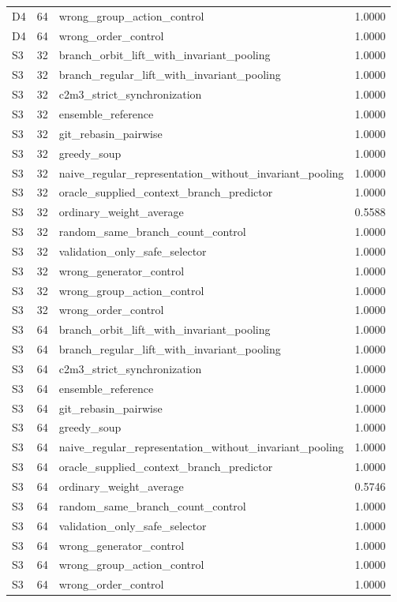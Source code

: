 \begin{tabular}{llll}
D4 & 64 & wrong\_group\_action\_control & 1.0000\\
D4 & 64 & wrong\_order\_control & 1.0000\\
S3 & 32 & branch\_orbit\_lift\_with\_invariant\_pooling & 1.0000\\
S3 & 32 & branch\_regular\_lift\_with\_invariant\_pooling & 1.0000\\
S3 & 32 & c2m3\_strict\_synchronization & 1.0000\\
S3 & 32 & ensemble\_reference & 1.0000\\
S3 & 32 & git\_rebasin\_pairwise & 1.0000\\
S3 & 32 & greedy\_soup & 1.0000\\
S3 & 32 & naive\_regular\_representation\_without\_invariant\_pooling & 1.0000\\
S3 & 32 & oracle\_supplied\_context\_branch\_predictor & 1.0000\\
S3 & 32 & ordinary\_weight\_average & 0.5588\\
S3 & 32 & random\_same\_branch\_count\_control & 1.0000\\
S3 & 32 & validation\_only\_safe\_selector & 1.0000\\
S3 & 32 & wrong\_generator\_control & 1.0000\\
S3 & 32 & wrong\_group\_action\_control & 1.0000\\
S3 & 32 & wrong\_order\_control & 1.0000\\
S3 & 64 & branch\_orbit\_lift\_with\_invariant\_pooling & 1.0000\\
S3 & 64 & branch\_regular\_lift\_with\_invariant\_pooling & 1.0000\\
S3 & 64 & c2m3\_strict\_synchronization & 1.0000\\
S3 & 64 & ensemble\_reference & 1.0000\\
S3 & 64 & git\_rebasin\_pairwise & 1.0000\\
S3 & 64 & greedy\_soup & 1.0000\\
S3 & 64 & naive\_regular\_representation\_without\_invariant\_pooling & 1.0000\\
S3 & 64 & oracle\_supplied\_context\_branch\_predictor & 1.0000\\
S3 & 64 & ordinary\_weight\_average & 0.5746\\
S3 & 64 & random\_same\_branch\_count\_control & 1.0000\\
S3 & 64 & validation\_only\_safe\_selector & 1.0000\\
S3 & 64 & wrong\_generator\_control & 1.0000\\
S3 & 64 & wrong\_group\_action\_control & 1.0000\\
S3 & 64 & wrong\_order\_control & 1.0000\\
\bottomrule
\end{tabular}
